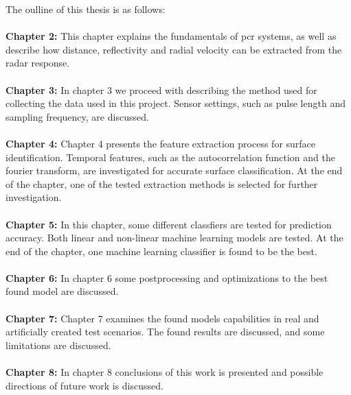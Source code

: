 The oulline of this thesis is as follows:
\\ \\
\noindent\textbf{Chapter 2:} This chapter explains the fundamentals of \gls{pcr} systems, as well as describe how distance, reflectivity and radial velocity can be extracted from the radar response. 
\\ \\
\noindent\textbf{Chapter 3:} In chapter 3 we proceed with describing the method used for collecting the data used in this project. Sensor settings, such as pulse length and sampling frequency, are discussed. 
\\ \\
\noindent\textbf{Chapter 4:} Chapter 4 presents the feature extraction process for surface identification. Temporal features, such as the autocorrelation function and the fourier transform, are investigated for accurate surface classification. At the end of the chapter, one of the tested extraction methods is selected for further investigation. 
\\ \\
\noindent\textbf{Chapter 5:}  In this chapter, some different classfiers are tested for prediction accuracy. Both linear and non-linear machine learning models are tested. At the end of the chapter, one machine learning classifier is found to be the best. 
\\ \\
\noindent\textbf{Chapter 6:} In chapter 6 some postprocessing and optimizations to the best found model are discussed. 
\\ \\
\noindent\textbf{Chapter 7:} Chapter 7 examines the found models capabilities in real and artificially created test scenarios. The found results are discussed, and some limitations are discussed.
\\ \\
\noindent\textbf{Chapter 8:} In chapter 8 conclusions of this work is presented and possible directions of future work is discussed. 










